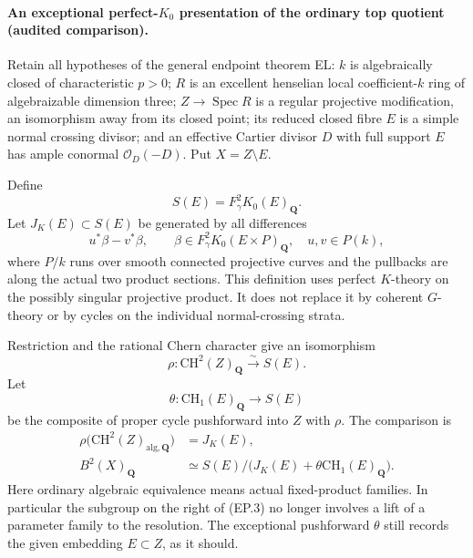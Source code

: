 \paragraph{An exceptional perfect-$K_0$ presentation of the ordinary
top quotient (audited comparison).}
Retain all hypotheses of the general endpoint theorem EL: $k$ is
algebraically closed of characteristic $p>0$; $R$ is an excellent
henselian local coefficient-$k$ ring of algebraizable dimension three;
$Z\to\operatorname{Spec}R$ is a regular projective modification,
an isomorphism away from its closed point; its reduced closed fibre
$E$ is a simple normal crossing divisor; and an effective Cartier
divisor $D$ with full support $E$ has ample conormal
$\mathcal O_D(-D)$.  Put $X=Z\setminus E$.

Define
\[
 S(E)=F_\gamma^2K_0(E)_{\mathbf Q}.
\]
Let $J_K(E)\subset S(E)$ be generated by all differences
\begin{equation}
          u^*\beta-v^*\beta,
 \qquad \beta\in F_\gamma^2K_0(E\times P)_{\mathbf Q},
 \quad u,v\in P(k),                              \tag{EP.1}
\end{equation}
where $P/k$ runs over smooth connected projective curves and the
pullbacks are along the actual two product sections.  This definition
uses perfect $K$-theory on the possibly singular projective product.
It does not replace it by coherent $G$-theory or by cycles on the
individual normal-crossing strata.

Restriction and the rational Chern character give an isomorphism
\begin{equation}
 \rho:\mathrm{CH}^2(Z)_{\mathbf Q}
       \xrightarrow{\sim}S(E).
                                                        \tag{EP.2}
\end{equation}
Let
\[
 \theta:\mathrm{CH}_1(E)_{\mathbf Q}\longrightarrow S(E)
\]
be the composite of proper cycle pushforward into $Z$ with $\rho$.
The comparison is
\begin{align}
 \rho\bigl(\mathrm{CH}^2(Z)_{\mathrm{alg},\mathbf Q}\bigr)
       &=J_K(E),                                      \tag{EP.3}\\
 B^2(X)_{\mathbf Q}
       &\simeq S(E)\big/
          \bigl(J_K(E)+\theta\mathrm{CH}_1(E)_{\mathbf Q}\bigr).
                                                        \tag{EP.4}
\end{align}
Here ordinary algebraic equivalence means actual fixed-product
families.  In particular the subgroup on the right of (EP.3) no
longer involves a lift of a parameter family to the resolution.
The exceptional pushforward $\theta$ still records the given
embedding $E\subset Z$, as it should.


